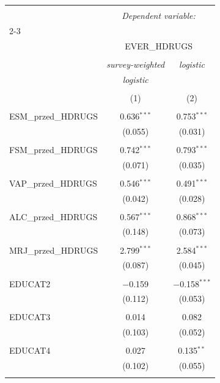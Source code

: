 
\begin{tabular}{@{\extracolsep{5pt}}lcc} 
\\[-1.8ex]\hline 
\hline \\[-1.8ex] 
 & \multicolumn{2}{c}{\textit{Dependent variable:}} \\ 
\cline{2-3} 
\\[-1.8ex] & \multicolumn{2}{c}{EVER\_HDRUGS} \\ 
\\[-1.8ex] & \textit{survey-weighted} & \textit{logistic} \\ 
 & \textit{logistic} & \textit{} \\ 
\\[-1.8ex] & (1) & (2)\\ 
\hline \\[-1.8ex] 
 ESM\_przed\_HDRUGS & 0.636$^{***}$ & 0.753$^{***}$ \\ 
  & (0.055) & (0.031) \\ 
  & & \\ 
 FSM\_przed\_HDRUGS & 0.742$^{***}$ & 0.793$^{***}$ \\ 
  & (0.071) & (0.035) \\ 
  & & \\ 
 VAP\_przed\_HDRUGS & 0.546$^{***}$ & 0.491$^{***}$ \\ 
  & (0.042) & (0.028) \\ 
  & & \\ 
 ALC\_przed\_HDRUGS & 0.567$^{***}$ & 0.868$^{***}$ \\ 
  & (0.148) & (0.073) \\ 
  & & \\ 
 MRJ\_przed\_HDRUGS & 2.799$^{***}$ & 2.584$^{***}$ \\ 
  & (0.087) & (0.045) \\ 
  & & \\ 
 EDUCAT2 & $-$0.159 & $-$0.158$^{***}$ \\ 
  & (0.112) & (0.053) \\ 
  & & \\ 
 EDUCAT3 & 0.014 & 0.082 \\ 
  & (0.103) & (0.052) \\ 
  & & \\ 
 EDUCAT4 & 0.027 & 0.135$^{**}$ \\ 
  & (0.102) & (0.055) \\ 
  & & \\ 

\end{tabular}
